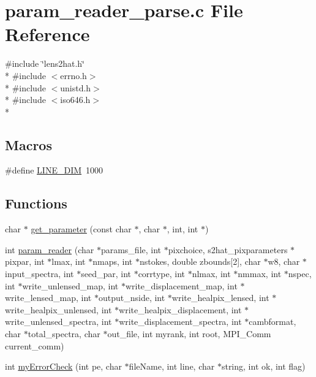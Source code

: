 \section{param\-\_\-reader\-\_\-parse.\-c File Reference}
\label{param__reader__parse_8c}
{\ttfamily \#include \char`\"{}lens2hat.\-h\char`\"{}}\\*
{\ttfamily \#include $<$errno.\-h$>$}\\*
{\ttfamily \#include $<$unistd.\-h$>$}\\*
{\ttfamily \#include $<$iso646.\-h$>$}\\*
\subsection*{Macros}
\begin{DoxyCompactItemize}
\item 
\#define \hyperlink{param__reader__parse_8c_a7d2d24512e1704eaf046667bee38b7ef}{L\-I\-N\-E\-\_\-\-D\-I\-M}~1000
\end{DoxyCompactItemize}
\subsection*{Functions}
\begin{DoxyCompactItemize}
\item 
char $\ast$ \hyperlink{param__reader__parse_8c_ab3cc75c29a38da58b8a99b6f65096891}{get\-\_\-parameter} (const char $\ast$, char $\ast$, int, int $\ast$)
\item 
int \hyperlink{param__reader__parse_8c_a990ccd7e0b3352322502e77838c159d7}{param\-\_\-reader} (char $\ast$params\-\_\-file, int $\ast$pixchoice, s2hat\-\_\-pixparameters $\ast$pixpar, int $\ast$lmax, int $\ast$nmaps, int $\ast$nstokes, double zbounds\mbox{[}2\mbox{]}, char $\ast$w8, char $\ast$input\-\_\-spectra, int $\ast$seed\-\_\-par, int $\ast$corrtype, int $\ast$nlmax, int $\ast$nmmax, int $\ast$nspec, int $\ast$write\-\_\-unlensed\-\_\-map, int $\ast$write\-\_\-displacement\-\_\-map, int $\ast$write\-\_\-lensed\-\_\-map, int $\ast$output\-\_\-nside, int $\ast$write\-\_\-healpix\-\_\-lensed, int $\ast$write\-\_\-healpix\-\_\-unlensed, int $\ast$write\-\_\-healpix\-\_\-displacement, int $\ast$write\-\_\-unlensed\-\_\-spectra, int $\ast$write\-\_\-displacement\-\_\-spectra, int $\ast$cambformat, char $\ast$total\-\_\-spectra, char $\ast$out\-\_\-file, int myrank, int root, M\-P\-I\-\_\-\-Comm current\-\_\-comm)
\item 
int \hyperlink{param__reader__parse_8c_a70bcbd531a6e4abc62d73f5b4532c2cc}{my\-Error\-Check} (int pe, char $\ast$file\-Name, int line, char $\ast$string, int ok, int flag)
\end{DoxyCompactItemize}


